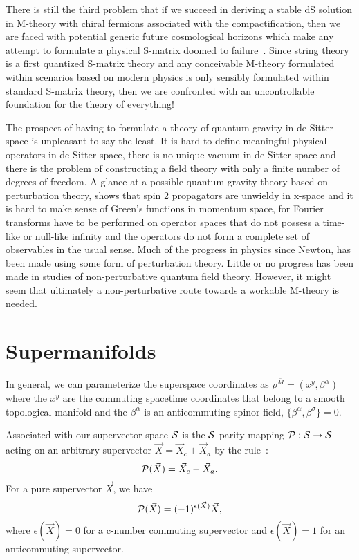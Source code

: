 \documentclass[a4paper,12pt]{article}
\begin{document}
There is still the third problem that if we succeed in deriving a
stable dS solution in M-theory with chiral fermions associated
with the compactification, then we are faced with potential
generic future cosmological horizons which make any attempt to
formulate a physical S-matrix doomed to failure~\cite{Bousso,Fischler}.
Since string theory is a first quantized S-matrix theory and any
conceivable M-theory formulated within scenarios based on modern
physics is only sensibly formulated within standard S-matrix
theory, then we are confronted with an uncontrollable foundation
for the theory of everything!

The prospect of having to formulate a theory of quantum gravity in de
Sitter space is unpleasant to say the least. It is hard to define
meaningful physical operators in de Sitter space, there is no unique vacuum
in de Sitter space and there is the problem of constructing a field theory
with only a finite number of degrees of freedom. A glance at a possible
quantum gravity theory based on perturbation theory, shows that spin 2
propagators are unwieldy in x-space and it is hard to make sense of Green's
functions in
momentum space, for Fourier transforms have to be performed on
operator spaces that do not possess a time-like or null-like
infinity and the operators do not form a complete set of
observables in the usual sense. Much of the progress in
physics since Newton, has been made using some form of
perturbation theory. Little or no progress has been made in
studies of non-perturbative quantum field theory. However, it
might seem that ultimately a non-perturbative route towards a workable
M-theory is needed.

\section{Supermanifolds}

In general, we can parameterize the superspace coordinates as
$\rho^{\bar M}=(x^y,\beta^\alpha)$ where the $x^y$ are the commuting
spacetime coordinates that belong to a smooth topological manifold and
the $\beta^\alpha$ is an anticommuting spinor field,
$\{\beta^\alpha,\beta^\sigma\}=0$.

Associated with our supervector space ${\cal S}$ is the ${\cal
S}$-parity mapping ${\cal P}:{\cal S}\rightarrow {\cal S}$ acting
on an arbitrary supervector ${\vec X}={\vec X}_c+{\vec X}_a$ by
the rule~\cite{Buchbinder,Berezin}:
\begin{equation}
{\cal P}({\vec X})={\vec X}_c-{\vec X}_a.
\end{equation}
For a pure supervector ${\vec X}$, we have
\begin{equation}
{\cal P}({\vec X})=(-1)^{\epsilon({\vec X})}{\vec X},
\end{equation}
where $\epsilon({\vec X})=0$ for a c-number commuting supervector
and $\epsilon({\vec X})=1$ for an anticommuting supervector.
\end{document}

